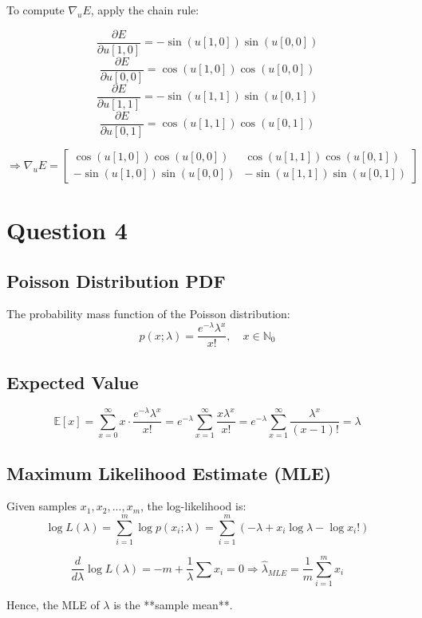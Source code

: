 \documentclass[12pt]{article}
\begin{document}
To compute $\nabla_u E$, apply the chain rule:

\[
\frac{\partial E}{\partial u[1,0]} = -\sin(u[1,0]) \sin(u[0,0])
\]
\[
\frac{\partial E}{\partial u[0,0]} = \cos(u[1,0]) \cos(u[0,0])
\]
\[
\frac{\partial E}{\partial u[1,1]} = -\sin(u[1,1]) \sin(u[0,1])
\]
\[
\frac{\partial E}{\partial u[0,1]} = \cos(u[1,1]) \cos(u[0,1])
\]

\[
\Rightarrow \nabla_u E =
\begin{bmatrix}
\cos(u[1,0]) \cos(u[0,0]) & \cos(u[1,1]) \cos(u[0,1]) \\
-\sin(u[1,0]) \sin(u[0,0]) & -\sin(u[1,1]) \sin(u[0,1])
\end{bmatrix}
\]

\newpage

\section*{Question 4}

\subsection*{Poisson Distribution PDF}

The probability mass function of the Poisson distribution:
\[
p(x; \lambda) = \frac{e^{-\lambda} \lambda^x}{x!}, \quad x \in \mathbb{N}_0
\]

\subsection*{Expected Value}

\[
\mathbb{E}[x] = \sum_{x=0}^{\infty} x \cdot \frac{e^{-\lambda} \lambda^x}{x!}
= e^{-\lambda} \sum_{x=1}^{\infty} \frac{x \lambda^x}{x!}
= e^{-\lambda} \sum_{x=1}^{\infty} \frac{\lambda^x}{(x-1)!}
= \lambda
\]

\subsection*{Maximum Likelihood Estimate (MLE)}

Given samples $x_1, x_2, ..., x_m$, the log-likelihood is:
\[
\log L(\lambda) = \sum_{i=1}^m \log p(x_i; \lambda)
= \sum_{i=1}^m \left(-\lambda + x_i \log \lambda - \log x_i!\right)
\]

\[
\frac{d}{d\lambda} \log L(\lambda) = -m + \frac{1}{\lambda} \sum x_i = 0
\Rightarrow \hat{\lambda}_{MLE} = \frac{1}{m} \sum_{i=1}^m x_i
\]

Hence, the MLE of $\lambda$ is the **sample mean**.
\end{document}
